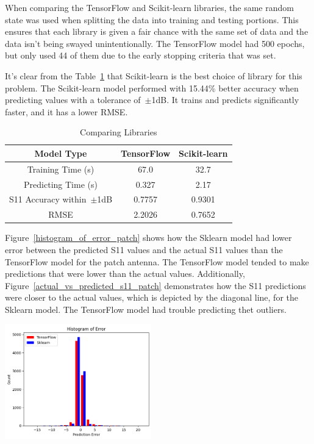 \documentclass[lettersize,journal]{IEEEtran}
\newenvironment{Figure}
    {\par\medskip\noindent\minipage{\linewidth}}
    {\endminipage\par\medskip}
\begin{document}
When comparing the TensorFlow and Scikit-learn libraries, the same random state was used when splitting the data into training and testing portions. This ensures that each library is given a fair chance with the same set of data and the data isn't being swayed unintentionally. The TensorFlow model had 500 epochs, but only used 44 of them due to the early stopping criteria that was set. 

It's clear from the Table~\ref{comparing_libraries} that Scikit-learn is the best choice of library for this problem. The Scikit-learn model performed with 15.44\% better accuracy when predicting values with a tolerance of~$\pm$1dB. It trains and predicts significantly faster, and it has a lower RMSE.

\begin{table}[h]
\caption{Comparing Libraries}
\begin{center}
\begin{tabular}{ |c|c|c| }
    \hline
    Model Type & TensorFlow & Scikit-learn \\ 
    \hline
    Training Time (s) & 67.0 & 32.7 \\  
    \hline
    Predicting Time (s) & 0.327 & 2.17 \\
    \hline
    S11 Accuracy within~$\pm$1dB & 0.7757 & 0.9301 \\
    \hline
    RMSE & 2.2026 & 0.7652 \\
    \hline
\end{tabular}
\end{center}
\label{comparing_libraries}
\end{table}

Figure~\ref{histogram_of_error_patch} shows how the Sklearn model had lower error between the predicted S11 values and the actual S11 values than the TensorFlow model for the patch antenna. The TensorFlow model tended to make predictions that were lower than the actual values. Additionally, Figure~\ref{actual_vs_predicted_s11_patch} demonstrates how the S11 predictions were closer to the actual values, which is depicted by the diagonal line, for the Sklearn model. The TensorFlow model had trouble predicting thet outliers. 

\begin{Figure}
    \centering
    \includegraphics[width=2.5in]{histogram_patch}
    \label{histogram_of_error_patch}
\end{Figure}
\end{document}
